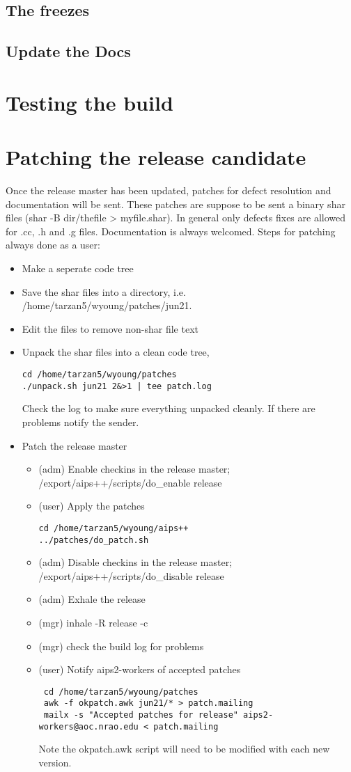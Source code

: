\subsection{The freezes}
\subsection{Update the Docs}
\section{Testing the build}
\section{Patching the release candidate}
Once the release master has been updated, patches for defect resolution and documentation will be
sent.  These patches are suppose to be sent a binary shar files (shar -B dir/thefile > myfile.shar).
In general only defects fixes are allowed for .cc, .h and .g files. Documentation is always welcomed.
Steps for patching always done as a user:
\begin{itemize}
\item Make a seperate code tree
\item Save the shar files into a directory, i.e. /home/tarzan5/wyoung/patches/jun21.
\item Edit the files to remove non-shar file text
\item Unpack the shar files into a clean code tree,
\begin{verbatim}
cd /home/tarzan5/wyoung/patches
./unpack.sh jun21 2&>1 | tee patch.log
\end{verbatim}
Check the log to make sure everything unpacked cleanly.  If there are problems notify the sender.
\item Patch the release master
\begin{itemize}
\item (adm) Enable checkins in the release master; /export/aips++/scripts/do\_enable release
\item (user) Apply the patches
\begin{verbatim}
cd /home/tarzan5/wyoung/aips++
../patches/do_patch.sh
\end{verbatim}
\item (adm) Disable checkins in the release master; /export/aips++/scripts/do\_disable release
\item (adm) Exhale the release
\item (mgr) inhale -R release -c
\item (mgr) check the build log for problems
\item (user) Notify aips2-workers of accepted patches
\begin{verbatim}
 cd /home/tarzan5/wyoung/patches
 awk -f okpatch.awk jun21/* > patch.mailing
 mailx -s "Accepted patches for release" aips2-workers@aoc.nrao.edu < patch.mailing
\end{verbatim}
Note the okpatch.awk script will need to be modified with each new version.
\end{itemize}
\end{itemize}
